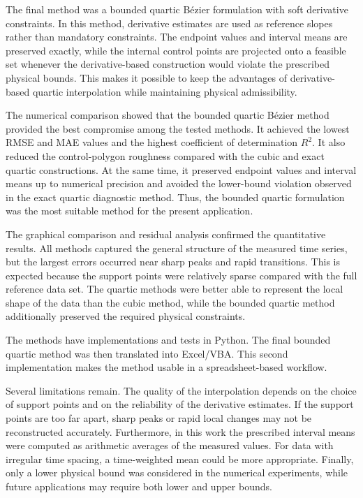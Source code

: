 \documentclass[12pt,a4paper]{article}
\begin{document}
The final method was a bounded quartic B\'ezier formulation with soft
derivative constraints. In this method, derivative estimates are used as
reference slopes rather than mandatory constraints. The endpoint values and
interval means are preserved exactly, while the internal control points are
projected onto a feasible set whenever the derivative-based construction
would violate the prescribed physical bounds. This makes it possible to keep
the advantages of derivative-based quartic interpolation while maintaining
physical admissibility.

The numerical comparison showed that the bounded quartic B\'ezier method
provided the best compromise among the tested methods. It achieved the lowest
RMSE and MAE values and the highest coefficient of determination \(R^2\). It
also reduced the control-polygon roughness compared with the cubic and exact
quartic constructions. At the same time, it preserved endpoint values and
interval means up to numerical precision and avoided the lower-bound
violation observed in the exact quartic diagnostic method. Thus, the bounded
quartic formulation was the most suitable method for the present application.

The graphical comparison and residual analysis confirmed the quantitative
results. All methods captured the general structure of the measured time
series, but the largest errors occurred near sharp peaks and rapid
transitions. This is expected because the support points were relatively
sparse compared with the full reference data set. The quartic methods were
better able to represent the local shape of the data than the cubic method,
while the bounded quartic method additionally preserved the required physical
constraints.

The methods have implementations and tests in Python. The final bounded quartic method
was then translated into Excel/VBA. This second implementation makes the
method usable in a spreadsheet-based workflow.

Several limitations remain. The quality of the interpolation depends on the
choice of support points and on the reliability of the derivative estimates.
If the support points are too far apart, sharp peaks or rapid local changes
may not be reconstructed accurately. Furthermore, in this work the prescribed
interval means were computed as arithmetic averages of the measured values.
For data with irregular time spacing, a time-weighted mean could be more
appropriate. Finally, only a lower physical bound was considered in the
numerical experiments, while future applications may require both lower and
upper bounds.
\end{document}
